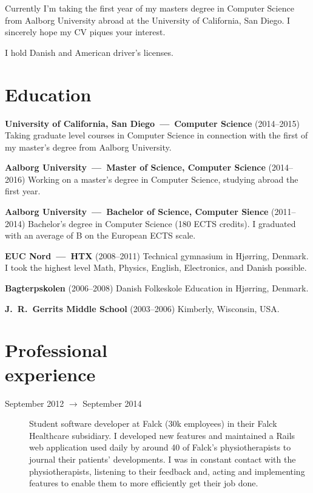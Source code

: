 \documentclass[margin,line]{resume}
\begin{document}
\begin{resume}
    Currently I'm taking the first year of my masters degree in Computer Science from Aalborg University abroad at the University of California, San Diego. I sincerely hope my CV piques your interest.
    
    I hold Danish and American driver's licenses.

\section{\mysidestyle{} Education}

    \textbf{University of California, San Diego~---~Computer Science}
    (2014--2015) Taking graduate level courses in Computer Science in connection with the first of my master's degree from Aalborg University.

    \textbf{Aalborg University~---~Master of Science, Computer Science}
    (2014--2016) Working on a master's degree in Computer Science, studying abroad the first year.

    \textbf{Aalborg University~---~Bachelor of Science, Computer Sience}
    (2011--2014) Bachelor's degree in Computer Science (180 ECTS credits). I graduated with an average of B on the European ECTS scale.      

    \textbf{EUC Nord~---~HTX} (2008--2011) Technical gymnasium in Hjørring, Denmark. I took the highest level Math, Physics, English, Electronics, and Danish possible.
    
    \textbf{Bagterpskolen} (2006--2008) Danish Folkeskole Education in Hjørring, Denmark.

    \textbf{J.\ R.\ Gerrits Middle School} (2003--2006) Kimberly, Wisconsin, USA\@.

\section{\mysidestyle{} Professional\\experience}\vspace{1mm}
\begin{description}

  \item[September 2012 $\rightarrow$ September 2014] Student software developer at Falck (30k employees) in their Falck Healthcare subsidiary. I developed new features and maintained a Rails web application used daily by around 40 of Falck's physiotherapists to journal their patients' developments. I was in constant contact with the physiotherapists, listening to their feedback and, acting and implementing features to enable them to more efficiently get their job done.


\end{description}
\end{resume}
\end{document}
